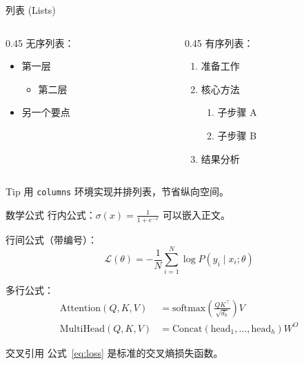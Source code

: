 \documentclass[aspectratio=169, 10pt, UTF8]{ctexbeamer}
\begin{document}
\begin{frame}{列表 (Lists)}
  \begin{columns}[T]
    \begin{column}{0.45\textwidth}
      无序列表：
      \begin{itemize}
        \item 第一层
        \begin{itemize}
          \item 第二层
        \end{itemize}
        \item 另一个要点
      \end{itemize}
    \end{column}

    \begin{column}{0.45\textwidth}
      有序列表：
      \begin{enumerate}
        \item 准备工作
        \item 核心方法
        \begin{enumerate}
          \item 子步骤 A
          \item 子步骤 B
        \end{enumerate}
        \item 结果分析
      \end{enumerate}
    \end{column}
  \end{columns}

  \vspace{12pt}
  \begin{alertblock}{Tip}
    用 \texttt{columns} 环境实现并排列表，节省纵向空间。
  \end{alertblock}
\end{frame}

\begin{frame}{数学公式}
  行内公式：$\sigma(x) = \frac{1}{1 + e^{-x}}$ 可以嵌入正文。

  行间公式（带编号）：
  \begin{equation}
    \mathcal{L}(\theta) = -\frac{1}{N} \sum_{i=1}^{N} \log P(y_i \mid x_i; \theta) \label{eq:loss}
  \end{equation}

  多行公式：
  \begin{align}
    \text{Attention}(Q, K, V) &= \text{softmax}\!\left(\frac{QK^\top}{\sqrt{d_k}}\right) V \\
    \text{MultiHead}(Q, K, V) &= \text{Concat}(\text{head}_1, \ldots, \text{head}_h) W^O
  \end{align}

  \begin{exampleblock}{交叉引用}
    公式~\eqref{eq:loss} 是标准的交叉熵损失函数。
  \end{exampleblock}
\end{frame}
\end{document}
